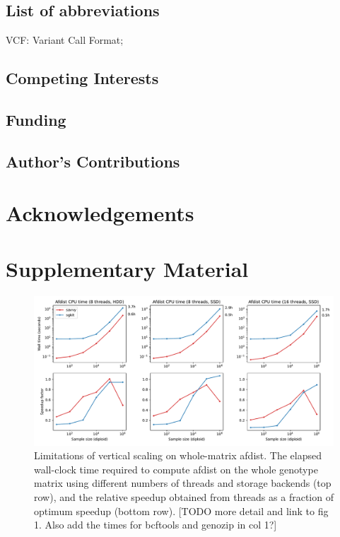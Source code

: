 \documentclass[a4paper,num-refs]{oup-contemporary}
\begin{document}
\subsection{List of abbreviations}

VCF: Variant Call Format;

\subsection{Competing Interests}

\subsection{Funding}

\subsection{Author's Contributions}

\section{Acknowledgements}





\clearpage
\renewcommand\thefigure{S\arabic{figure}}
\setcounter{figure}{0}
\renewcommand\thetable{S\arabic{table}}
\setcounter{table}{0}

\section*{Supplementary Material}

\begin{figure}[ht]
	\begin{center}
		\includegraphics[width=\textwidth]{figures/whole-matrix-compute-supplemental}
	\end{center}
	\caption{\label{fig-whole-matrix-compute-supplemental}
    Limitations of vertical scaling on whole-matrix afdist. The elapsed
wall-clock time required to compute afdist on the whole genotype matrix using
different numbers of threads and storage backends (top row), and the relative
speedup obtained from threads as a fraction of optimum speedup (bottom row).
[TODO more detail and link to fig 1. Also add the times for bcftools and
genozip in col 1?]
}
\end{figure}
\end{document}
